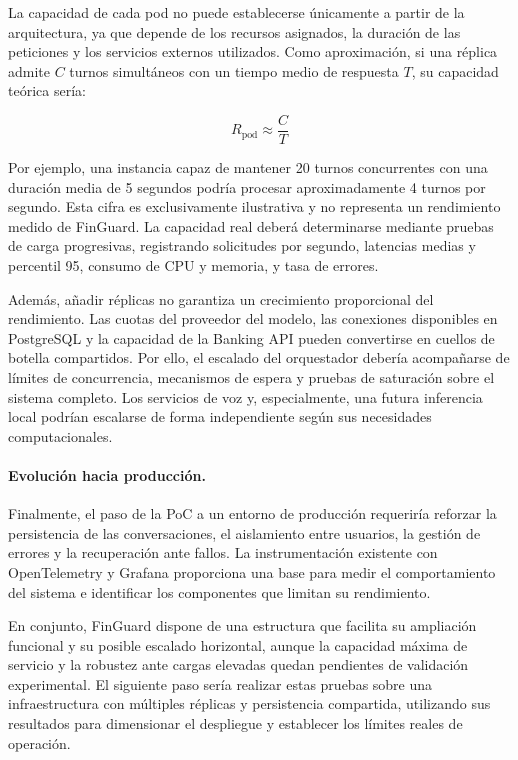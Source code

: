 \documentclass[12pt,a4paper]{article}
\begin{document}
La capacidad de cada pod no puede establecerse únicamente a partir de la arquitectura, ya que depende de los recursos asignados, la duración de las peticiones y los servicios externos utilizados. Como aproximación, si una réplica admite $C$ turnos simultáneos con un tiempo medio de respuesta $T$, su capacidad teórica sería:

\[
R_{\mathrm{pod}} \approx \frac{C}{T}
\]

Por ejemplo, una instancia capaz de mantener 20 turnos concurrentes con una duración media de 5 segundos podría procesar aproximadamente 4 turnos por segundo. Esta cifra es exclusivamente ilustrativa y no representa un rendimiento medido de FinGuard. La capacidad real deberá determinarse mediante pruebas de carga progresivas, registrando solicitudes por segundo, latencias medias y percentil 95, consumo de CPU y memoria, y tasa de errores.

Además, añadir réplicas no garantiza un crecimiento proporcional del rendimiento. Las cuotas del proveedor del modelo, las conexiones disponibles en PostgreSQL y la capacidad de la Banking API pueden convertirse en cuellos de botella compartidos. Por ello, el escalado del orquestador debería acompañarse de límites de concurrencia, mecanismos de espera y pruebas de saturación sobre el sistema completo. Los servicios de voz y, especialmente, una futura inferencia local podrían escalarse de forma independiente según sus necesidades computacionales.

\paragraph{Evolución hacia producción.}

Finalmente, el paso de la PoC a un entorno de producción requeriría reforzar la persistencia de las conversaciones, el aislamiento entre usuarios, la gestión de errores y la recuperación ante fallos. La instrumentación existente con OpenTelemetry y Grafana proporciona una base para medir el comportamiento del sistema e identificar los componentes que limitan su rendimiento.

En conjunto, FinGuard dispone de una estructura que facilita su ampliación funcional y su posible escalado horizontal, aunque la capacidad máxima de servicio y la robustez ante cargas elevadas quedan pendientes de validación experimental. El siguiente paso sería realizar estas pruebas sobre una infraestructura con múltiples réplicas y persistencia compartida, utilizando sus resultados para dimensionar el despliegue y establecer los límites reales de operación.
\end{document}
